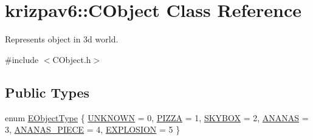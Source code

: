 \hypertarget{classkrizpav6_1_1_c_object}{}\section{krizpav6\+::C\+Object Class Reference}
\label{classkrizpav6_1_1_c_object}


Represents object in 3d world.  




{\ttfamily \#include $<$C\+Object.\+h$>$}

\subsection*{Public Types}
\begin{DoxyCompactItemize}
\item 
enum \mbox{\hyperlink{classkrizpav6_1_1_c_object_a54fa6c9a881bd5b3e1b4bc606444997f}{E\+Object\+Type}} \{ \newline
\mbox{\hyperlink{classkrizpav6_1_1_c_object_a54fa6c9a881bd5b3e1b4bc606444997fa70bc8296b78658bcf2f86484374a19be}{U\+N\+K\+N\+O\+WN}} = 0, 
\mbox{\hyperlink{classkrizpav6_1_1_c_object_a54fa6c9a881bd5b3e1b4bc606444997fa4f75fd2e4715235d623b3eb9402ea2fe}{P\+I\+Z\+ZA}} = 1, 
\mbox{\hyperlink{classkrizpav6_1_1_c_object_a54fa6c9a881bd5b3e1b4bc606444997fa4f83607fe6d7743596d3b37489f13436}{S\+K\+Y\+B\+OX}} = 2, 
\mbox{\hyperlink{classkrizpav6_1_1_c_object_a54fa6c9a881bd5b3e1b4bc606444997fad1b6147c24112f6b5f9e4acdd174123c}{A\+N\+A\+N\+AS}} = 3, 
\newline
\mbox{\hyperlink{classkrizpav6_1_1_c_object_a54fa6c9a881bd5b3e1b4bc606444997fa6646e464fa4d9ec3e9e10ff4c00891a2}{A\+N\+A\+N\+A\+S\+\_\+\+P\+I\+E\+CE}} = 4, 
\mbox{\hyperlink{classkrizpav6_1_1_c_object_a54fa6c9a881bd5b3e1b4bc606444997faa97c4ef18714d1f1f5394854d6cd9712}{E\+X\+P\+L\+O\+S\+I\+ON}} = 5
 \}
\end{DoxyCompactItemize}
